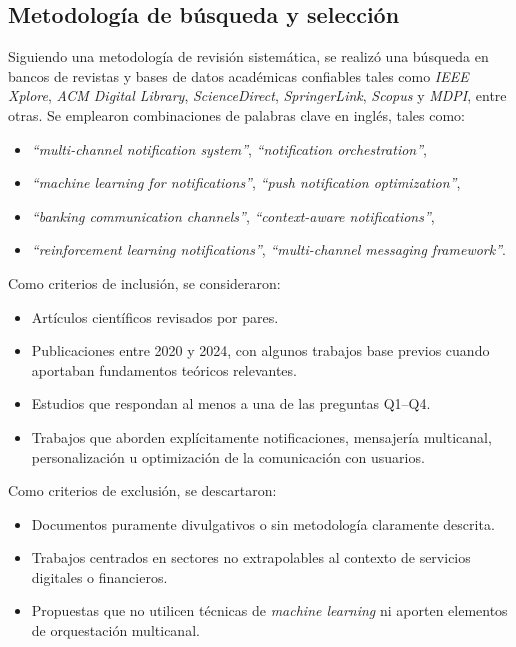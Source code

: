 \documentclass[conference]{IEEEtran}
\begin{document}
\subsection{Metodología de búsqueda y selección}

Siguiendo una metodología de revisión sistemática, se realizó una búsqueda en bancos de revistas y bases de datos académicas confiables tales como \textit{IEEE Xplore}, \textit{ACM Digital Library}, \textit{ScienceDirect}, \textit{SpringerLink}, \textit{Scopus} y \textit{MDPI}, entre otras. Se emplearon combinaciones de palabras clave en inglés, tales como:
\begin{itemize}
  \item \textit{``multi-channel notification system''}, \textit{``notification orchestration''},
  \item \textit{``machine learning for notifications''}, \textit{``push notification optimization''},
  \item \textit{``banking communication channels''}, \textit{``context-aware notifications''},
  \item \textit{``reinforcement learning notifications''}, \textit{``multi-channel messaging framework''}.
\end{itemize}

Como criterios de inclusión, se consideraron:
\begin{itemize}
  \item Artículos científicos revisados por pares.
  \item Publicaciones entre 2020 y 2024, con algunos trabajos base previos cuando aportaban fundamentos teóricos relevantes.
  \item Estudios que respondan al menos a una de las preguntas Q1--Q4.
  \item Trabajos que aborden explícitamente notificaciones, mensajería multicanal, personalización u optimización de la comunicación con usuarios.
\end{itemize}

Como criterios de exclusión, se descartaron:
\begin{itemize}
  \item Documentos puramente divulgativos o sin metodología claramente descrita.
  \item Trabajos centrados en sectores no extrapolables al contexto de servicios digitales o financieros.
  \item Propuestas que no utilicen técnicas de \textit{machine learning} ni aporten elementos de orquestación multicanal.
\end{itemize}
\end{document}
